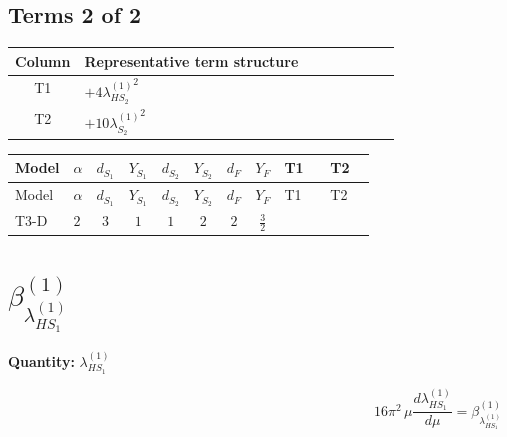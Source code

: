 \documentclass[8pt]{article}
\begin{document}
\begin{landscape}
\subsection*{Terms 2 of 2}
\begin{center}
\begin{tabular}{@{}c >{\raggedright\arraybackslash}p{0.82\linewidth}@{}}
\toprule
Column & Representative term structure \\
\midrule
T1 & \(\displaystyle +4 {\lambda_{HS_2}^{(1)}}^2\) \\
\midrule
T2 & \(\displaystyle +10 {\lambda_{S_2}^{(1)}}^2\) \\
\midrule
\bottomrule
\end{tabular}
\end{center}
\smallskip
\tiny
\begin{longtable}{@{}llcccccc >{\raggedright\arraybackslash}p{0.21\linewidth} >{\raggedright\arraybackslash}p{0.21\linewidth}@{}}
\toprule
Model & $\alpha$ & $d_{S_1}$ & $Y_{S_1}$ & $d_{S_2}$ & $Y_{S_2}$ & $d_F$ & $Y_F$ & T1 & T2 \\
\midrule
\endfirsthead
\toprule
Model & $\alpha$ & $d_{S_1}$ & $Y_{S_1}$ & $d_{S_2}$ & $Y_{S_2}$ & $d_F$ & $Y_F$ & T1 & T2 \\
\midrule
\endhead
T3-D & $2$ & $3$ & $1$ & $1$ & $2$ & $2$ & $\frac{3}{2}$ & \scriptsize\adjustbox{max width=\linewidth}{$\begin{gathered} +4 {\lambda_{HS_2}^{(1)}}^2\end{gathered}$} & \scriptsize\adjustbox{max width=\linewidth}{$\begin{gathered} +10 {\lambda_{S_2}^{(1)}}^2\end{gathered}$} \\
\midrule
\bottomrule
\end{longtable}
\clearpage
\section*{$\beta_{\lambda_{HS_1}^{(1)}}^{(1)}$}
\noindent\textbf{Quantity: }$\lambda_{HS_1}^{(1)}$\par\smallskip
\[16\pi^2\,\mu\frac{d \lambda_{HS_1}^{(1)}}{d\mu}=\beta_{\lambda_{HS_1}^{(1)}}^{(1)}\]

\end{landscape}
\end{document}

